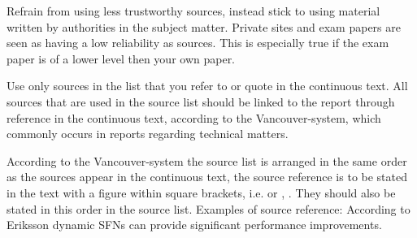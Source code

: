 Refrain from using less trustworthy sources, instead stick to using material written by authorities in the subject matter. Private sites and exam papers are seen as having a low reliability as sources. This is especially true if the exam paper is of a lower level then your own paper.

Use only sources in the list that you refer to or quote in the continuous text. All sources that are used in the source list should be linked to the report through reference in the continuous text, according to the Vancouver-system, which commonly occurs in reports regarding technical matters.

According to the Vancouver-system the source list is arranged in the same order as the sources appear in the continuous text, the source reference is to be stated in the text with a figure within square brackets, i.e. \cite{dataterm-kth} or \cite{eriksson-2001}, \cite{stomquist}. They should also be stated in this order in the source list. Examples of source reference: According to Eriksson \cite{eriksson-2001}  dynamic SFNs can provide significant performance improvements.
